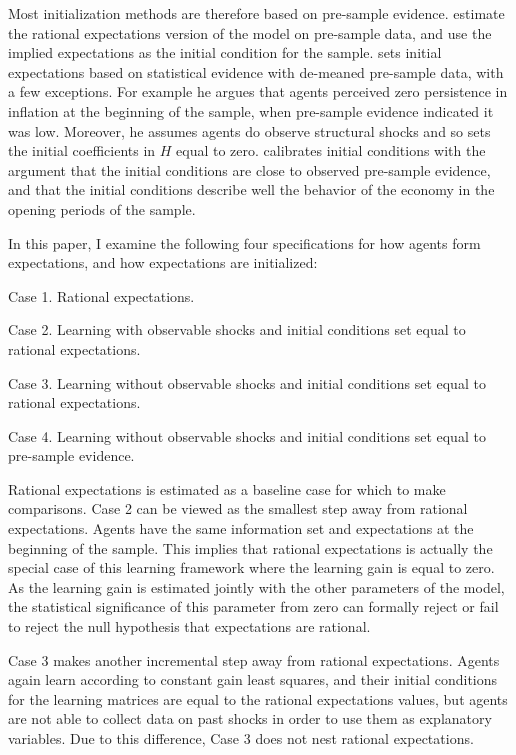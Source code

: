 Most initialization methods are therefore based on pre-sample evidence.   estimate the rational expectations version of the model on pre-sample data, and use the implied expectations as the initial condition for the sample.   sets initial expectations based on statistical evidence with de-meaned pre-sample data, with a few exceptions.  For example he argues that agents perceived zero persistence in inflation at the beginning of the sample, when pre-sample evidence indicated it was low.  Moreover, he assumes agents do observe structural shocks and so sets the initial coefficients in $H$ equal to zero.   calibrates initial conditions with the argument that the initial conditions are close to observed pre-sample evidence, and that the initial conditions describe well the behavior of the economy in the opening periods of the sample.  

In this paper, I examine the following four specifications for how agents form expectations, and how expectations are initialized:
\bd
\item Case 1.  Rational expectations.  
\item Case 2.  Learning with observable shocks and initial conditions set equal to rational expectations.
\item Case 3.  Learning without observable shocks and initial conditions set equal to rational expectations.
\item Case 4.  Learning without observable shocks and initial conditions set equal to pre-sample evidence.
\ed

Rational expectations is estimated as a baseline case for which to make comparisons.  Case 2 can be viewed as the smallest step away from rational expectations.  Agents have the same information set and expectations at the beginning of the sample.  This implies that rational expectations is actually the special case of this learning framework where the learning gain is equal to zero.  As the learning gain is estimated jointly with the other parameters of the model, the statistical significance of this parameter from zero can formally reject or fail to reject the null hypothesis that expectations are rational.

Case 3 makes another incremental step away from rational expectations.  Agents again learn according to constant gain least squares, and their initial conditions for the learning matrices are equal to the rational expectations values, but agents are not able to collect data on past shocks in order to use them as explanatory variables.  Due to this difference, Case 3 does not nest rational expectations.

